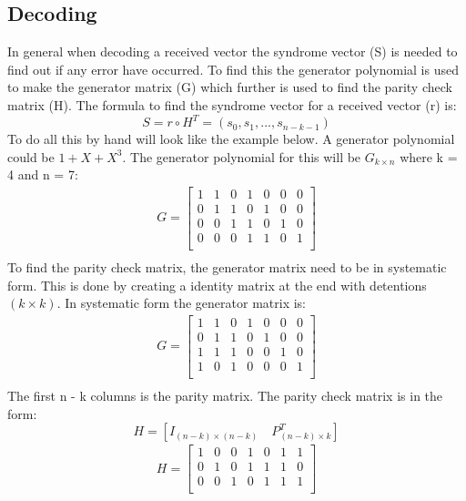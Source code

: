 \documentclass[Main]{subfiles}
\begin{document}
\subsection*{Decoding}
In general when decoding a received vector the syndrome vector (S) is needed to find out if any error have occurred.
To find this the generator polynomial is used to make the generator matrix (G) which further is used to find the parity check matrix (H).
The formula to find the syndrome vector for a received vector (r) is:
\begin{equation}
S = r \circ H^T = (s_{0},s_{1}, ..., s_{n-k-1})
\end{equation}
To do all this by hand will look like the example below.
A generator polynomial could be $1+X+X^3$. 
The generator polynomial for this will be $G_{k \times n}$ where k = 4 and n = 7:
\begin{align*}
G =
\begin{bmatrix}
1 & 1 & 0 & 1 & 0 & 0 & 0\\
0 & 1 & 1 & 0 & 1 & 0 & 0\\
0 & 0 & 1 & 1 & 0 & 1 & 0\\
0 & 0 & 0 & 1 & 1 & 0 & 1\\
\end{bmatrix} \\
\end{align*}
To find the parity check matrix, the generator matrix need to be in systematic form.
This is done by creating a identity matrix at the end with detentions $(k \times k)$.
In systematic form the generator matrix is:
\begin{align*}
G =
\begin{bmatrix}
1 & 1 & 0 & 1 & 0 & 0 & 0\\
0 & 1 & 1 & 0 & 1 & 0 & 0\\
1 & 1 & 1 & 0 & 0 & 1 & 0\\
1 & 0 & 1 & 0 & 0 & 0 & 1\\
\end{bmatrix} \\
\end{align*}
The first n - k columns is the parity matrix.
The parity check matrix is in the form:
\begin{equation}
H = [I_{(n-k) \times (n-k)} \quad P^T_{(n-k) \times k}]
\end{equation}
\begin{align*}
H =
\begin{bmatrix}
1 & 0 & 0 & 1 & 0 & 1 & 1\\
0 & 1 & 0 & 1 & 1 & 1 & 0\\
0 & 0 & 1 & 0 & 1 & 1 & 1\\
\end{bmatrix} \\
\end{align*}
\end{document}
